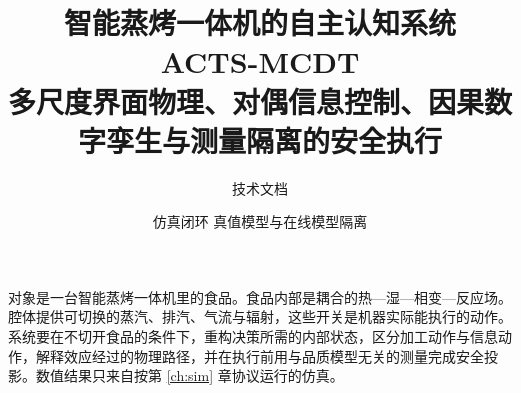 \documentclass[a4paper,11pt,openany]{ctexbook}
\title{\bfseries 智能蒸烤一体机的自主认知系统\\[0.45em]
\large ACTS-MCDT\\[0.35em]
\normalsize 多尺度界面物理、对偶信息控制、因果数字孪生与测量隔离的安全执行}
\author{技术文档}
\date{仿真闭环 \quad 真值模型与在线模型隔离}
\begin{document}
\maketitle
\thispagestyle{empty}

\begin{center}
\parbox{0.9\textwidth}{\small
对象是一台智能蒸烤一体机里的食品。食品内部是耦合的热—湿—相变—反应场。腔体提供可切换的蒸汽、排汽、气流与辐射，这些开关是机器实际能执行的动作。系统要在不切开食品的条件下，重构决策所需的内部状态，区分加工动作与信息动作，解释效应经过的物理路径，并在执行前用与品质模型无关的测量完成安全投影。数值结果只来自按第 \ref{ch:sim} 章协议运行的仿真。
}
\end{center}

\tableofcontents
\clearpage
\end{document}

